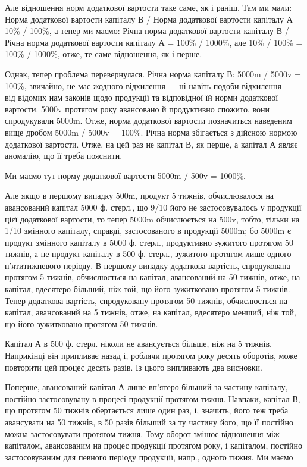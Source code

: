 Але відношення норм додаткової вартости таке саме, як і раніш. Там ми мали:
Норма додаткової вартости капіталу В / Норма додаткової вартости капіталу А =
10\% / 100\%, а тепер ми маємо:
Річна норма додаткової вартости капіталу В / Річна норма додаткової вартости капіталу А = 100\% /
1000\%, але 10\% / 100\% = 100\% / 1000\%, отже, те саме відношення, як і перше.

Однак, тепер проблема перевернулася. Річна норма капіталу В:
5000m / 5000v = 100\%, звичайно, не має жодного відхилення — ні навіть
подоби відхилення — від відомих нам законів щодо продукції та відповідної
їй норми додаткової вартости. 5000v протягом року авансовано й
продуктивно спожито, вони спродукували 5000m. Отже, норма додаткової
вартости позначиться наведеним вище дробом 5000m / 5000v = 100\%. Річна
норма збігається з дійсною нормою додаткової вартости. Отже, на цей
раз не капітал В, як перше, а капітал А являє аномалію, що її треба
пояснити.

Ми маємо тут норму додаткової вартости 5000m / 500v = 1000\%.

Але якщо в першому випадку 500m, продукт 5 тижнів, обчислювалося
на авансований капітал 5000 ф. стерл., що 9/10 його не застосовувалось
у продукції цієї додаткової вартости, то тепер 5000m обчислюється на 500v,
тобто, тільки на 1/10 змінного капіталу, справді, застосованого в продукції
5000m; бо 5000m є продукт змінного капіталу в 5000 ф. стерл., продуктивно
зужитого протягом 50 тижнів, а не продукт капіталу в 500 ф. стерл.,
зужитого протягом лише одного п’ятитижневого періоду. В першому випадку
додаткова вартість, спродукована протягом 5 тижнів, обчислюється
на капітал, авансований на 50 тижнів, отже, на капітал, вдесятеро більший,
ніж той, що його зужитковано протягом 5 тижнів. Тепер додаткова вартість,
спродуковану протягом 50 тижнів, обчислюється на капітал, авансований
на 5 тижнів, отже, на капітал, вдесятеро менший, ніж той, що
його зужитковано протягом 50 тижнів.

Капітал А в 500 ф. стерл. ніколи не авансується більше, ніж на 5 тижнів.
Наприкінці він припливає назад і, роблячи протягом року десять
оборотів, може повторити цей процес десять разів. Із цього випливають
два висновки.

Поперше, авансований капітал А лише вп’ятеро більший за частину
капіталу, постійно застосовувану в процесі продукції протягом
тижня. Навпаки, капітал В, що протягом 50 тижнів обертається лише
один раз, і, значить, його теж треба авансувати на 50 тижнів, в 50 разів
більший за ту частину його, що її постійно можна застосовувати протягом
тижня. Тому оборот змінює відношення між капіталом, авансованим
на процес продукції протягом року, і капіталом, постійно застосовуваним
для певного періоду продукції, напр., одного тижня. Ми маємо
